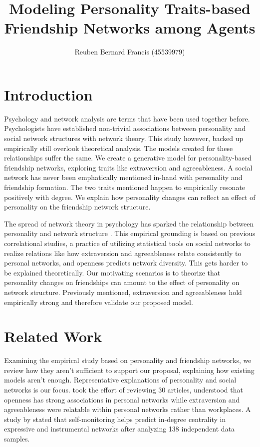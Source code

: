 \documentclass[runningheads]{llncs}
\begin{document}
\title{Modeling Personality Traits-based Friendship Networks among Agents}

\author{Reuben Bernard Francis (45539979)}
%
\maketitle              %

%
%
%
\section{Introduction}
Psychology and network analysis are terms that have been used together before. Psychologists have established non-trivial associations between personality and social network structures with network theory. This study however, backed up empirically still overlook theoretical analysis. The models created for these relationships suffer the same. We create a generative model for personality-based friendship networks, exploring traits like extraversion and agreeableness. A social network has never been emphatically mentioned in-hand with personality and friendship formation. The two traits mentioned happen to empirically resonate positively with degree. We explain how personality changes can reflect an effect of personality on the friendship network structure.

The spread of network theory in psychology has sparked the relationship between personality and network structure \cite{ref_2}. This empirical grounding is based on previous correlational studies, a practice of utilizing statistical tools on social networks to realize relations like how extraversion and agreeableness relate consistently to personal networks, and openness predicts network diversity. This gets harder to be explained theoretically. Our motivating scenarios is to theorize that personality changes on friendships can amount to the effect of personality on network structure. Previously mentioned, extraversion and agreeableness hold empirically strong and therefore validate our proposed model. 

\section{Related Work}
Examining the empirical study based on personality and friendship networks, we review how they aren’t sufficient to support our proposal, explaining how existing models aren’t enough.  Representative explanations of personality and social networks is our focus.\cite{ref_2} took the effort of reviewing 30 articles, understood that openness has strong associations in personal networks while extraversion and agreeableness were relatable within personal networks rather than workplaces. A study by \cite{ref_3} stated that self-monitoring helps predict in-degree centrality in expressive and instrumental networks after analyzing 138 independent data samples.
\end{document}
